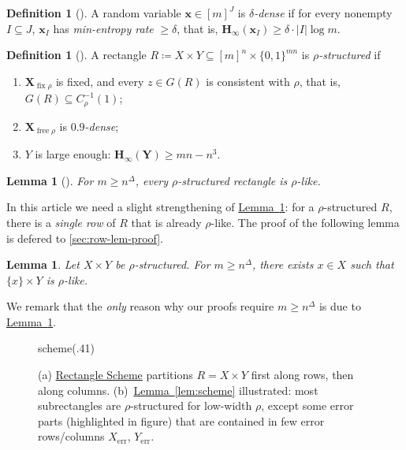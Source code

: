 \documentclass[11pt]{article}
\numberwithin{equation}{section}
\newtheorem{lemma}[theorem]{Lemma}
\theoremstyle{definition}
\newtheorem{definition}[theorem]{Definition}
\theoremstyle{plain}
\newcommand{\expref}[2]{\hyperref[#2]{#1~\ref{#2}}}
\newcommand{\rectlemma}{\expref{Lemma}{lem:scheme}\xspace}%
\newcommand{\rectscheme}{\hyperref[alg:partition]{Rectangle Scheme}\xspace}
\newcommand{\Hmin}{\mathbf{H}_\infty}
\DeclareMathOperator{\free}{free}
\DeclareMathOperator{\fix}{fix}
\DeclareMathOperator{\err}{err}
\newcommand{\x}{\bm{x}}
\newcommand{\X}{\bm{X}}
\newcommand{\Y}{\bm{Y}}
\newcommand{\allX}{[m]^n}
\newcommand{\allY}{\{0,1\}^{mn}}
\begin{document}
\begin{definition}[\cite{goos16rectangles}]
A random variable $\x\in[m]^J$ is \emph{$\delta$-dense} if for every nonempty $I\subseteq J$, $\x_I$ has \emph{min-entropy rate} $\geq \delta$, that is, $\Hmin(\x_I) \geq \delta\cdot |I|\log m$.
\end{definition}
\begin{definition}[\cite{goos17pnp,goos17bpp}] \label{def:structured}
A rectangle $R\coloneqq X\times Y\subseteq\allX\times\allY$ is \emph{$\rho$-structured} if
\begin{enumerate}
\item $\X_{\fix \rho}$ is fixed, and every $z\in G(R)$ is consistent with $\rho$, that is, $G(R)\subseteq C_\rho^{-1}(1)$;
\item $\X_{\free \rho}$ is \emph{$0.9$-dense};
\item $Y$ is large enough: $\Hmin(\Y)\geq mn-n^3$.
\end{enumerate}
\end{definition}


\begin{lemma}[\cite{goos17pnp,goos17bpp}] \label{lem:gadget}
For $m \ge n^\Delta$, every $\rho$-structured rectangle is $\rho$-like.
\end{lemma}

In this %
article   %
we need a slight strengthening of \expref{Lemma}{lem:gadget}: for a $\rho$-structured $R$, there is a \emph{single row} of $R$ that is already $\rho$-like. The proof of the following lemma is defered to \autoref{sec:row-lem-proof}.

\begin{lemma} \label{lem:row}
Let $X\times Y$ be $\rho$-structured. For $m \ge n^\Delta$, there exists $x\in X$ such that $\{x\}\times Y$ is $\rho$-like.
\end{lemma}

We remark that the \emph{only} reason why our proofs require $m \ge n^\Delta$ is due to \expref{Lemma}{lem:row}.

\begin{figure}[t]
	\centering
%
	\begin{lpic}[t(-4mm),b(-2mm)]{scheme(.41)}        
		\large
		\lbl[c]{165,27.5;$X_{\err}$}
		\lbl[c]{272.5,112;$Y_{\err}$}
		\normalsize
	\end{lpic}
	\caption{(a) \rectscheme partitions $R=X\times Y$ first along rows, then along columns. (b)~\rectlemma illustrated: most subrectangles are $\rho$-structured for low-width $\rho$, except some error parts (highlighted in figure) that are contained in few error rows/columns $X_{\err}$, $Y_{\err}$.}
	\label{fig:scheme}
\end{figure}
\end{document}
